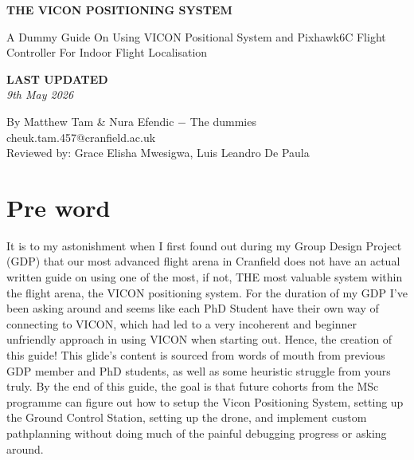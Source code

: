 \documentclass[12pt]{article}
\numberwithin{equation}{section}
\begin{document}
\thispagestyle{empty} 
\begin{titlepage}
   \noindent %
\begin{minipage}{0.25\textwidth}
\end{minipage}%
\hfill %
    \begin{center}
       \vspace*{4cm}
       {\LARGE \textbf{THE VICON POSITIONING SYSTEM}}\\
       \vspace{5mm}
       
       {\LARGE {A Dummy Guide On Using VICON Positional System and Pixhawk6C Flight Controller For Indoor Flight Localisation}}\\

       \vspace{3cm}
    \begin{large}   
    
   
        {\bf LAST UPDATED} \\
        \textit{9th May 2026}        
        
       \vspace{4cm}
      By Matthew Tam \& Nura Efendic $-$ The dummies \\
      cheuk.tam.457@cranfield.ac.uk \\

    \vfill
    Reviewed by: Grace Elisha Mwesigwa, Luis Leandro De Paula
    \end{large}  
   \end{center}
\end{titlepage}
\newpage
\raggedright\tableofcontents
\thispagestyle{empty}
\cleardoublepage


\section{Pre word}
It is to my astonishment when I first found out during my Group Design Project (GDP) that our most advanced flight arena in Cranfield does not have an actual written guide on using one of the most, if not, THE most valuable system within the flight arena, the VICON positioning system. For the duration of my GDP I've been asking around and seems like each PhD Student have their own way of connecting to VICON, which had led to a very incoherent and beginner unfriendly approach in using VICON when starting out. Hence, the creation of this guide! This glide's content is sourced from words of mouth from previous GDP member and PhD students, as well as some heuristic struggle from yours truly. By the end of this guide, the goal is that future cohorts from the MSc programme can figure out how to setup the Vicon Positioning System, setting up the Ground Control Station, setting up the drone, and implement custom pathplanning without doing much of the painful debugging progress or asking around. 
\end{document}
